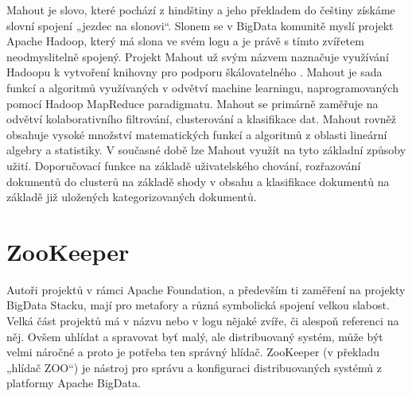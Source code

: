 Mahout je slovo, které pochází z hindštiny a jeho překladem do češtiny získáme slovní spojení „jezdec na slonovi“. Slonem se v BigData komunitě myslí projekt Apache Hadoop, který má slona ve svém logu a je právě s tímto zvířetem neodmyslitelně spojený. Projekt Mahout už svým názvem naznačuje využívání Hadoopu k vytvoření knihovny pro podporu škálovatelného . Mahout je sada funkcí a algoritmů využívaných v odvětví machine learningu, naprogramovaných pomocí Hadoop MapReduce paradigmatu. Mahout se primárně zaměřuje na odvětví kolaborativního filtrování, clusterování a klasifikace dat. Mahout rovněž obsahuje vysoké množství matematických funkcí a algoritmů z oblasti lineární algebry a statistiky. V současné době lze Mahout využít na tyto základní způsoby užití. Doporučovací funkce na základě uživatelského chování, rozřazování dokumentů do clusterů na základě shody v obsahu a klasifikace dokumentů na základě již uložených kategorizovaných dokumentů. %

\section {ZooKeeper}

Autoři projektů v rámci Apache Foundation, a především ti zaměření na projekty BigData Stacku, mají pro metafory a různá symbolická spojení velkou slabost. Velká část projektů má v názvu nebo v logu nějaké zvíře, či alespoň referenci na něj. Ovšem uhlídat a spravovat byť malý, ale distribuovaný systém, může být velmi náročné a proto je potřeba ten správný hlídač. ZooKeeper (v překladu „hlídač ZOO“) je nástroj pro správu a konfiguraci distribuovaných systémů z platformy Apache BigData. 

